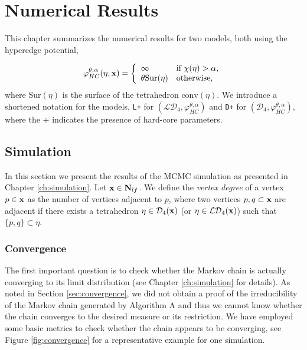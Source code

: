 \chapter{Numerical Results}\label{ch:numeric}
This chapter summarizes the numerical results for two models, both using the hyperedge potential, 

\begin{equation}\label{eq:model}
	\varphi_{HC}^{\theta,\alpha}(\eta,{\mathbf{x}}) = 
\left\{
    \begin{array}{ll}
	    \infty & \mbox{if } \chi(\eta) > \alpha, \\
	    \theta \mathrm{Sur}(\eta) & \mbox{otherwise, }
    \end{array}
    \right.
\end{equation}
where $\mathrm{Sur}(\eta)$ is the surface of the tetrahedron $\mathrm{conv}(\eta)$. We introduce a shortened notation for the models, \texttt{L+} for $(\mathcal {LD}_4, \varphi^{\theta,\alpha}_{HC})$ and \texttt{D+} for $(\mathcal D_4, \varphi^{\theta,\alpha}_{HC})$, where the $+$ indicates the presence of hard-core parameters.

 

\section{Simulation}
In this section we present the results of the MCMC simulation as presented in Chapter \ref{ch:simulation}. Let ${\mathbf{x}} \in \mathbf N_{lf}$. We define the \textit{vertex degree} of a vertex $p \in {\mathbf{x}}$ as the number of vertices adjacent to $p$, where two vertices $p,q\subset {\mathbf{x}}$ are adjacent if there exists a tetrahedron $\eta \in \mathcal D_4({\mathbf{x}})$ (or $\eta\in\mathcal {LD}_4({\mathbf{x}})$) such that $\{p,q\} \subset \eta$. 

\subsection{Convergence}
The first important question is to check whether the Markov chain is actually converging to its limit distribution (see Chapter \ref{ch:simulation} for details). As noted in Section \ref{sec:convergence}, we did not obtain a proof of the irreducibility of the Markov chain generated by Algorithm A and thus we cannot know whether the chain converges to the desired measure or its restriction. We have employed some basic metrics to check whether the chain appears to be converging, see Figure \ref{fig:convergence} for a representative example for one simulation.

